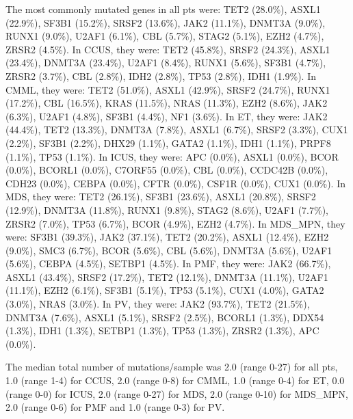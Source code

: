 The most commonly mutated genes in all pts were: TET2 (28.0\%), ASXL1 (22.9\%), SF3B1 (15.2\%), SRSF2 (13.6\%), JAK2 (11.1\%), DNMT3A (9.0\%), RUNX1 (9.0\%), U2AF1 (6.1\%), CBL (5.7\%), STAG2 (5.1\%), EZH2 (4.7\%), ZRSR2 (4.5\%). In CCUS, they were: TET2 (45.8\%), SRSF2 (24.3\%), ASXL1 (23.4\%), DNMT3A (23.4\%), U2AF1 (8.4\%), RUNX1 (5.6\%), SF3B1 (4.7\%), ZRSR2 (3.7\%), CBL (2.8\%), IDH2 (2.8\%), TP53 (2.8\%), IDH1 (1.9\%). In CMML, they were: TET2 (51.0\%), ASXL1 (42.9\%), SRSF2 (24.7\%), RUNX1 (17.2\%), CBL (16.5\%), KRAS (11.5\%), NRAS (11.3\%), EZH2 (8.6\%), JAK2 (6.3\%), U2AF1 (4.8\%), SF3B1 (4.4\%), NF1 (3.6\%). In ET, they were: JAK2 (44.4\%), TET2 (13.3\%), DNMT3A (7.8\%), ASXL1 (6.7\%), SRSF2 (3.3\%), CUX1 (2.2\%), SF3B1 (2.2\%), DHX29 (1.1\%), GATA2 (1.1\%), IDH1 (1.1\%), PRPF8 (1.1\%), TP53 (1.1\%). In ICUS, they were: APC (0.0\%), ASXL1 (0.0\%), BCOR (0.0\%), BCORL1 (0.0\%), C7ORF55 (0.0\%), CBL (0.0\%), CCDC42B (0.0\%), CDH23 (0.0\%), CEBPA (0.0\%), CFTR (0.0\%), CSF1R (0.0\%), CUX1 (0.0\%). In MDS, they were: TET2 (26.1\%), SF3B1 (23.6\%), ASXL1 (20.8\%), SRSF2 (12.9\%), DNMT3A (11.8\%), RUNX1 (9.8\%), STAG2 (8.6\%), U2AF1 (7.7\%), ZRSR2 (7.0\%), TP53 (6.7\%), BCOR (4.9\%), EZH2 (4.7\%). In MDS_MPN, they were: SF3B1 (39.3\%), JAK2 (37.1\%), TET2 (20.2\%), ASXL1 (12.4\%), EZH2 (9.0\%), SMC3 (6.7\%), BCOR (5.6\%), CBL (5.6\%), DNMT3A (5.6\%), U2AF1 (5.6\%), CEBPA (4.5\%), SETBP1 (4.5\%). In PMF, they were: JAK2 (66.7\%), ASXL1 (43.4\%), SRSF2 (17.2\%), TET2 (12.1\%), DNMT3A (11.1\%), U2AF1 (11.1\%), EZH2 (6.1\%), SF3B1 (5.1\%), TP53 (5.1\%), CUX1 (4.0\%), GATA2 (3.0\%), NRAS (3.0\%). In PV, they were: JAK2 (93.7\%), TET2 (21.5\%), DNMT3A (7.6\%), ASXL1 (5.1\%), SRSF2 (2.5\%), BCORL1 (1.3\%), DDX54 (1.3\%), IDH1 (1.3\%), SETBP1 (1.3\%), TP53 (1.3\%), ZRSR2 (1.3\%), APC (0.0\%).

The median total number of mutations/sample was 2.0 (range 0-27) for all pts, 1.0 (range 1-4) for CCUS, 2.0 (range 0-8) for CMML, 1.0 (range 0-4) for ET, 0.0 (range 0-0) for ICUS, 2.0 (range 0-27) for MDS, 2.0 (range 0-10) for MDS_MPN, 2.0 (range 0-6) for PMF and 1.0 (range 0-3) for PV.


